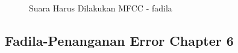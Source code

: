 \begin{enumerate}
\begin{itemize}
\begin{figure}[!hbtp]
\caption{Suara Harus Dilakukan MFCC - fadila}
\label{suara-mfcc-fadila}
\end{figure}
\par
\par
\par
\par
\par
\par
\par
\par
\par
\end{itemize}
\end{enumerate}

\par
\par
\par
\subsection{ Fadila-Penanganan Error Chapter 6}
